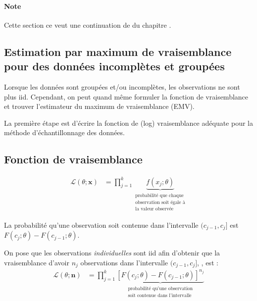 \documentclass[french]{article}
\begin{document}
\begin{multicols*}{2}
\paragraph{Note}	Cette section ce veut une continuation de \underline{} du chapitre \underline{}.

\bigskip

\subsection*{Estimation par maximum de vraisemblance pour des données incomplètes et groupées}
\begin{rappel_enhanced}[Contexte]
Lorsque les données sont groupées et/ou incomplètes, les observations ne sont plus iid. Cependant, on peut quand même formuler la fonction de vraisemblance et trouver l'estimateur du maximum de vraisemblance (EMV).

\bigskip

La première étape est d'écrire la fonction de (log) vraisemblance adéquate pour la méthode d'échantillonnage des données.
\end{rappel_enhanced}


\setlength{\mathindent}{-0.75cm}
\subsection{Fonction de vraisemblance}
\begin{definitionNOHFILLprop}
\begin{align*}
	\mathcal{L}(\theta; \bm{x})
	&=	\prod^{k}_{j	=	1} \underbrace{f(x_{j}; \theta)}_{\substack{\text{probabilité que chaque}\\ \text{observation soit égale à}\\ \text{la valeur observée}}}
\end{align*}
\end{definitionNOHFILLprop}

\begin{definitionNOHFILLprop}
La probabilité qu'une observation soit contenue dans l'intervalle $(c_{j - 1}, c_{j}]$ est $F(c_{j}; \theta)	-	F(c_{j - 1}; \theta)$.

\bigskip

On pose que les observations \textit{individuelles} sont iid afin d'obtenir que la vraisemblance d'avoir $n_{j}$ observations dans l'intervalle $(c_{j - 1}, c_{j}]$, , est :
\begin{align*}
	\mathcal{L}(\theta; \bm{n})
	&=	\prod^{k}_{j	=	1} \underbrace{\left[F(c_{j}; \theta)	-	F(c_{j - 1}; \theta)\right]^{n_{j}}}_{\substack{\text{probabilité qu'une observation}\\ \text{soit contenue dans l'intervalle}}}
\end{align*}
\end{definitionNOHFILLprop}


\end{multicols*}
\end{document}
